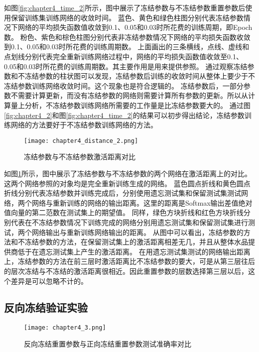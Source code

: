 如图\ref{fig:chapter4_time_2}所示，图中展示了冻结参数与不冻结参数重置参数后使用保留训练集训练网络的收敛时间。
蓝色、黄色和绿色柱图分别代表冻结参数情况下网络的平均损失函数值收敛到0.1、0.05和0.03时所花费的训练周期，即Epoch数。
粉色、紫色和棕色柱图分别代表非冻结参数情况下网络的平均损失函数收敛到0.1、0.05和0.03时所花费的训练周期数。
上面画出的三条横线，点线、虚线和点划线分别代表完全重新训练网络过程中，网络的平均损失函数值收敛至0.1、0.05和0.03时所花费的训练周期数。其主要作用是用来提供参照。
通过观察冻结参数和不冻结参数的柱状图可以发现，冻结参数后训练的收敛时间从整体上要少于不冻结参数训练网络收敛时间。这个现象也是符合逻辑的。
冻结参数后，一部分参数不需要计算更新，而没有冻结参数的网络则需要计算所有参数的更新。所以从计算量上分析，不冻结参数训练网络所需要的工作量是比冻结参数要大的。
通过图\ref{fig:chapter4_2}和图\ref{fig:chapter4_time_2}的结果可以初步得出结论，冻结参数训练网络的方法要好于不冻结参数训练网络的方法。
\begin{figure}
    \centering
    \texttt{[image: chapter4\_distance\_2.png]}
    \caption{冻结参数与不冻结参数激活距离对比}
    \label{fig:chapter4_distance_2}
\end{figure}

如图\ref{fig:chapter4_distance_2}所示，图中展示了冻结参数与不冻结参数的两个网络在激活距离上的对比。这两个网络参照的对象均是完全重新训练生成的网络。
蓝色圆点折线和黄色圆点折线分别代表冻结参数并训练完成后，分别使用遗忘测试集和保留测试集测试网络，两个网络与重新训练的网络的输出距离。这里的距离是Softmax输出差值绝对值向量的第二范数在测试集上的期望值。
同样，绿色方块折线和红色方块折线分别代表在不冻结参数情况下训练完成的网络分别用遗忘测试集和保留测试集进行测试，两个网络输出与重新训练网络输出的距离。
从图中可以看出，冻结参数的方法和不冻结参数的方法，在保留测试集上的激活距离相差无几，并且从整体水品提供商低于在遗忘测试集上产生的激活距离。
在用遗忘测试集测试的网络输出距离上，冻结参数的方法在前三层时激活距离比不冻结参数的要大，可是从第三层往后的层次冻结与不冻结的激活距离很相近。因此重置参数的层数选择第三层以后，这个差异是可以忽略不计的。

\subsection{反向冻结验证实验}
\begin{figure}
    \centering
    \texttt{[image: chapter4\_3.png]}
    \caption{反向冻结重置参数与正向冻结重置参数测试准确率对比}
    \label{fig:chapter4_3}
\end{figure}

